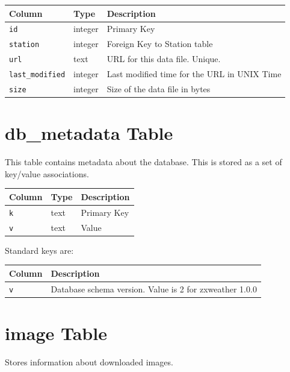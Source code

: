 \documentclass[a4paper,10pt]{book}
\begin{document}
\begin{tabular}{p{2.5cm} p{2.5cm} l}
\hline
\textbf{Column} & \textbf{Type} & \textbf{Description} \\
\hline
\verb|id| & integer & Primary Key\\
\verb|station| & integer & Foreign Key to Station table\\
\verb|url| & text & URL for this data file. Unique.\\
\verb|last_modified| & integer & Last modified time for the URL in UNIX Time\\
\verb|size| & integer & Size of the data file in bytes\\
\hline
\end{tabular}

\section{db\_metadata Table}
This table contains metadata about the database. This is stored as a set of key/value associations.

\begin{tabular}{p{2.5cm} p{2.5cm} l}
\hline
\textbf{Column} & \textbf{Type} & \textbf{Description} \\
\hline
\verb|k| & text & Primary Key\\
\verb|v| & text & Value\\
\hline
\end{tabular}

Standard keys are:

\begin{tabular}{p{2.5cm} l}
\hline
\textbf{Column} & \textbf{Description} \\
\hline
\verb|v| & Database schema version. Value is 2 for zxweather 1.0.0\\
\hline
\end{tabular}

\section{image Table}
Stores information about downloaded images.
\end{document}
